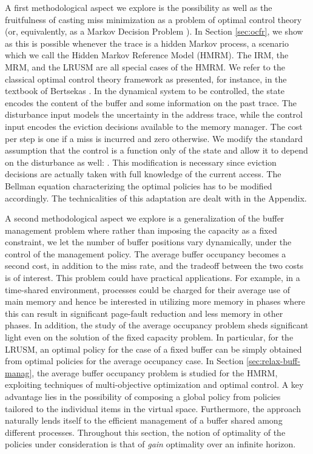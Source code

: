 \documentclass[11pt,a4paper]{article}
\theoremstyle{definition}
\theoremstyle{remark}
\begin{document}
A first methodological aspect we explore is the possibility as well as
the fruitfulness of casting miss minimization as a problem of optimal
control theory (or, equivalently, as a Markov Decision Problem
\cite{LewisP02}).  In Section \ref{sec:ocfr}, we show as this is
possible whenever the trace is a hidden Markov process, a scenario
which we call the Hidden Markov Reference Model (HMRM). The IRM, the
MRM, and the LRUSM are all special cases of the HMRM.  We refer to the
classical optimal control theory framework as presented, for instance,
in the textbook of Bertsekas \cite{Bertsekas00}.  In the dynamical
system to be controlled, the state encodes the content of the buffer
and some information on the past trace.  The disturbance input models
the uncertainty in the address trace, while the control input encodes
the eviction decisions available to the memory manager. The cost per
step is one if a miss is incurred and zero otherwise.  We modify the
standard assumption that the control is a function only of the state
and allow it to depend on the disturbance as well:
.  This modification is necessary since eviction
decisions are actually taken with full knowledge of the current
access.  The Bellman equation characterizing the optimal policies has
to be modified accordingly. The technicalities of this adaptation are
dealt with in the Appendix.

A second methodological aspect we explore is a generalization of the
buffer management problem where rather than imposing the capacity as a
fixed constraint, we let the number of buffer positions vary
dynamically, under the control of the management policy. The average
buffer occupancy becomes a second cost, in addition to the miss rate,
and the tradeoff between the two costs is of interest. This problem
could have practical applications. For example, in a time-shared
environment, processes could be charged for their average use of main
memory and hence be interested in utilizing more memory in phases
where this can result in significant page-fault reduction and less
memory in other phases. In addition, the study of the average
occupancy problem sheds significant light even on the solution of the
fixed capacity problem. In particular, for the LRUSM, an optimal
policy for the case of a fixed buffer can be simply obtained from
optimal policies for the average occupancy case. In Section
\ref{sec:relax-buff-manag}, the average buffer occupancy problem is
studied for the HMRM, exploiting techniques of multi-objective
optimization and optimal control. A key advantage lies in the possibility of composing a
global policy from policies tailored to the individual items in the
virtual space. Furthermore, the approach naturally lends itself to the
efficient management of a buffer shared among different processes.
Throughout this section, the notion of optimality of the policies
under consideration is that of \emph{gain} optimality over an infinite
horizon.
\end{document}
